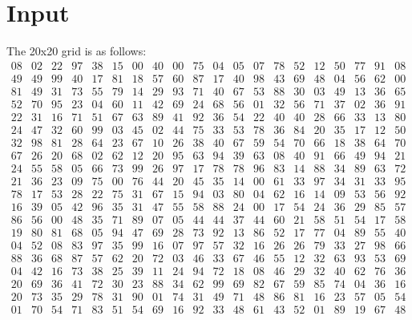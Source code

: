 \documentclass{article}
\begin{document}
\section*{Input}
The 20x20 grid is as follows:
\[
\begin{array}{cccccccccccccccccccc}
 08 & 02 & 22 & 97 & 38 & 15 & 00 & 40 & 00 & 75 & 04 & 05 & 07 & 78 & 52 & 12 & 50 & 77 & 91 & 08 \\
 49 & 49 & 99 & 40 & 17 & 81 & 18 & 57 & 60 & 87 & 17 & 40 & 98 & 43 & 69 & 48 & 04 & 56 & 62 & 00 \\
 81 & 49 & 31 & 73 & 55 & 79 & 14 & 29 & 93 & 71 & 40 & 67 & 53 & 88 & 30 & 03 & 49 & 13 & 36 & 65 \\
 52 & 70 & 95 & 23 & 04 & 60 & 11 & 42 & 69 & 24 & 68 & 56 & 01 & 32 & 56 & 71 & 37 & 02 & 36 & 91 \\
 22 & 31 & 16 & 71 & 51 & 67 & 63 & 89 & 41 & 92 & 36 & 54 & 22 & 40 & 40 & 28 & 66 & 33 & 13 & 80 \\
 24 & 47 & 32 & 60 & 99 & 03 & 45 & 02 & 44 & 75 & 33 & 53 & 78 & 36 & 84 & 20 & 35 & 17 & 12 & 50 \\
 32 & 98 & 81 & 28 & 64 & 23 & 67 & 10 & 26 & 38 & 40 & 67 & 59 & 54 & 70 & 66 & 18 & 38 & 64 & 70 \\
 67 & 26 & 20 & 68 & 02 & 62 & 12 & 20 & 95 & 63 & 94 & 39 & 63 & 08 & 40 & 91 & 66 & 49 & 94 & 21 \\
 24 & 55 & 58 & 05 & 66 & 73 & 99 & 26 & 97 & 17 & 78 & 78 & 96 & 83 & 14 & 88 & 34 & 89 & 63 & 72 \\
 21 & 36 & 23 & 09 & 75 & 00 & 76 & 44 & 20 & 45 & 35 & 14 & 00 & 61 & 33 & 97 & 34 & 31 & 33 & 95 \\
 78 & 17 & 53 & 28 & 22 & 75 & 31 & 67 & 15 & 94 & 03 & 80 & 04 & 62 & 16 & 14 & 09 & 53 & 56 & 92 \\
 16 & 39 & 05 & 42 & 96 & 35 & 31 & 47 & 55 & 58 & 88 & 24 & 00 & 17 & 54 & 24 & 36 & 29 & 85 & 57 \\
 86 & 56 & 00 & 48 & 35 & 71 & 89 & 07 & 05 & 44 & 44 & 37 & 44 & 60 & 21 & 58 & 51 & 54 & 17 & 58 \\
 19 & 80 & 81 & 68 & 05 & 94 & 47 & 69 & 28 & 73 & 92 & 13 & 86 & 52 & 17 & 77 & 04 & 89 & 55 & 40 \\
 04 & 52 & 08 & 83 & 97 & 35 & 99 & 16 & 07 & 97 & 57 & 32 & 16 & 26 & 26 & 79 & 33 & 27 & 98 & 66 \\
 88 & 36 & 68 & 87 & 57 & 62 & 20 & 72 & 03 & 46 & 33 & 67 & 46 & 55 & 12 & 32 & 63 & 93 & 53 & 69 \\
 04 & 42 & 16 & 73 & 38 & 25 & 39 & 11 & 24 & 94 & 72 & 18 & 08 & 46 & 29 & 32 & 40 & 62 & 76 & 36 \\
 20 & 69 & 36 & 41 & 72 & 30 & 23 & 88 & 34 & 62 & 99 & 69 & 82 & 67 & 59 & 85 & 74 & 04 & 36 & 16 \\
 20 & 73 & 35 & 29 & 78 & 31 & 90 & 01 & 74 & 31 & 49 & 71 & 48 & 86 & 81 & 16 & 23 & 57 & 05 & 54 \\
 01 & 70 & 54 & 71 & 83 & 51 & 54 & 69 & 16 & 92 & 33 & 48 & 61 & 43 & 52 & 01 & 89 & 19 & 67 & 48 \\
\end{array}
\]
\end{document}
